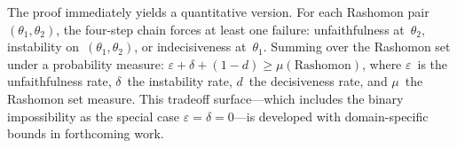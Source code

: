 
The proof immediately yields a quantitative version.
For each Rashomon pair~$(\theta_1, \theta_2)$, the four-step chain
forces at least one failure: unfaithfulness at~$\theta_2$,
instability on~$(\theta_1, \theta_2)$, or indecisiveness at~$\theta_1$.
Summing over the Rashomon set under a probability measure:
$\varepsilon + \delta + (1-d) \geq \mu(\text{Rashomon})$,
where $\varepsilon$~is the unfaithfulness rate, $\delta$~the
instability rate, $d$~the decisiveness rate, and
$\mu$~the Rashomon set measure.
This tradeoff surface---which includes the binary impossibility
as the special case $\varepsilon = \delta = 0$---is developed
with domain-specific bounds in forthcoming work.

